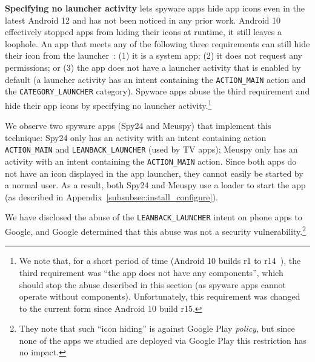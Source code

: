 
\textbf{Specifying no launcher activity} lets spyware apps hide app
icons even in the latest Android 12 and has not been noticed in any prior work.
Android 10 effectively stopped apps from hiding their icons at
runtime, it still leaves a loophole. An app that meets any of the
following three requirements can still hide their icon from the
launcher~\cite{Launcher79:online}: (1) it is a system app; (2) it does
not request any permissions; or (3) the app does not have a launcher
activity that is enabled by default (a launcher activity has an intent
containing the \texttt{ACTION\_MAIN} action and the
\texttt{CATEGORY\_LAUNCHER} category). Spyware apps abuse the third
requirement and hide their app icons by specifying no launcher
activity.\footnote{We note that, for a short period of time (Android 10 builds r1 to r14~\cite{Launcher48:online}), the third requirement was ``the app does not have any components'', which should stop the abuse described in this section (as spyware apps cannot operate without components). Unfortunately, this requirement was changed to the current form since Android 10 build r15.\label{footnote:hide_icon}}

We observe two spyware apps (Spy24 and Meuspy) that implement this
technique: Spy24 only has an activity with an intent containing action
\texttt{ACTION\_MAIN} and \texttt{LEANBACK\_LAUNCHER} (used by TV
apps); Meuspy only has an activity with an intent containing
the \texttt{ACTION\_MAIN} action.
Since both apps do not have an icon displayed in the app launcher,
they cannot easily be started by a normal user.  As a result, both
Spy24 and Meuspy use a loader to start the app (as described in
Appendix~\ref{subsubsec:install_configure}).

We have disclosed the abuse of the \texttt{LEANBACK\_LAUNCHER} intent
on phone apps to Google, and Google determined that
this abuse was not a security vulnerability.\footnote{They note that such ``icon hiding'' is against Google Play \emph{policy}, but since none of the apps we studied are deployed via Google Play this restriction has no impact.}

